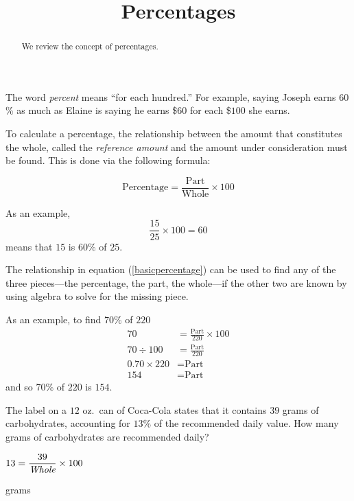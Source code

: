 \documentclass{ximera}
\title{Percentages}
\begin{document}
\begin{abstract}
We review the concept of percentages.
\end{abstract}
\maketitle

The word \emph{percent} means ``for each hundred.'' For example, saying Joseph earns $60$\% as much as Elaine is saying he earns \$$60$ for each \$$100$ she earns.

To calculate a percentage, the relationship between the amount that constitutes the whole, called the \emph{reference amount} and the amount under consideration must be found. This is done via the following formula:

\begin{equation}\label{basicpercentage}
\text{Percentage}=\frac{\text{Part}}{\text{Whole}}\times 100
\end{equation}


As an example,
\[
\frac{15}{25}\times 100=60
\]
means that $15$ is $60\%$ of $25$.

The relationship in equation (\ref{basicpercentage}) can be used to find any of the three pieces---the percentage, the part, the whole---if the other two are known by using algebra to solve for the missing piece.

As an example, to find $70\%$ of $220$
\begin{align*}
70&=\frac{\text{Part}}{220}\times 100\\
70\div 100 &=\frac{\text{Part}}{220}\\
0.70\times 220 &=\text{Part}\\
154&=\text{Part}
\end{align*}
and so $70\%$ of $220$ is $154$.

\begin{question}
The label on a $12$ oz.\ can of Coca-Cola states that it contains $39$ grams of carbohydrates, accounting for $13$\% of the recommended daily value. How many grams of carbohydrates are recommended daily?

\begin{hint}
$\displaystyle 13=\frac{39}{\emph{\text{Whole}}}\times 100$
\end{hint}
 grams

\end{question}
\end{document}
